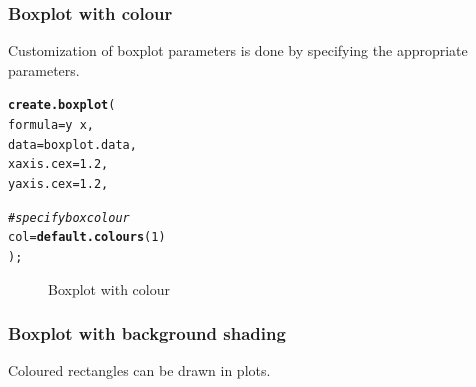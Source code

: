 \documentclass[letterpaper]{report}\usepackage[]{graphicx}\usepackage[]{color}
\makeatletter
\newcommand{\hlnum}[1]{\textcolor[rgb]{0.686,0.059,0.569}{#1}}%
\newcommand{\hlcom}[1]{\textcolor[rgb]{0.678,0.584,0.686}{\textit{#1}}}%
\newcommand{\hlopt}[1]{\textcolor[rgb]{0,0,0}{#1}}%
\newcommand{\hlstd}[1]{\textcolor[rgb]{0.345,0.345,0.345}{#1}}%
\newcommand{\hlkwc}[1]{\textcolor[rgb]{0.333,0.667,0.333}{#1}}%
\newcommand{\hlkwd}[1]{\textcolor[rgb]{0.737,0.353,0.396}{\textbf{#1}}}%
\newenvironment{kframe}{%
 \def\at@end@of@kframe{}%
 \ifinner\ifhmode%
  \def\at@end@of@kframe{\end{minipage}}%
  \begin{minipage}{\columnwidth}%
 \fi\fi%
 \def\FrameCommand##1{\hskip\@totalleftmargin \hskip-\fboxsep
 \colorbox{shadecolor}{##1}\hskip-\fboxsep
     \hskip-\linewidth \hskip-\@totalleftmargin \hskip\columnwidth}%
 \MakeFramed {\advance\hsize-\width
   \@totalleftmargin\z@ \linewidth\hsize
   \@setminipage}}%
 {\par\unskip\endMakeFramed%
 \at@end@of@kframe}
\newenvironment{knitrout}{}{} %
\makeatother
\begin{document}
\subsubsection{Boxplot with colour}
Customization of boxplot parameters is done by specifying the appropriate parameters.
\begin{knitrout}
\color{fgcolor}\begin{kframe}
\begin{alltt}
\hlkwd{create.boxplot}\hlstd{(}
    \hlkwc{formula} \hlstd{= y} \hlopt{~} \hlstd{x,}
    \hlkwc{data} \hlstd{= boxplot.data,}
    \hlkwc{xaxis.cex} \hlstd{=} \hlnum{1.2}\hlstd{,}
    \hlkwc{yaxis.cex} \hlstd{=} \hlnum{1.2}\hlstd{,}

    \hlcom{# specify box colour}
    \hlkwc{col} \hlstd{=} \hlkwd{default.colours}\hlstd{(}\hlnum{1}\hlstd{)}
    \hlstd{);}
\end{alltt}
\end{kframe}\begin{figure}

{\centering {} 

}

\caption[Boxplot with colour]{Boxplot with colour}\label{fig:boxplot2}
\end{figure}


\end{knitrout}

\subsubsection{Boxplot with background shading}
Coloured rectangles can be drawn in plots.
\end{document}
